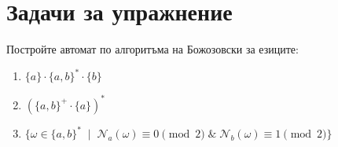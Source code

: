 \documentclass[12pt]{article}
\begin{document}
\section{Задачи за упражнение}
Постройте автомат по алгоритъма на Божозовски за езиците:
\begin{enumerate}
    \item \(\{a\} \cdot \{a, b\}^* \cdot \{b\} \)
    \item \((\{a, b\}^+ \cdot \{a\})^*\)
    \item \(\{\omega \in \{a, b\}^* \; \mid \; \mathcal{N}_a(\omega) \equiv 0 \pmod{2} \; \& \; \mathcal{N}_b(\omega) \equiv 1 \pmod{2} \}\)
\end{enumerate}
\end{document}
